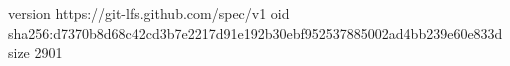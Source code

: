 version https://git-lfs.github.com/spec/v1
oid sha256:d7370b8d68c42cd3b7e2217d91e192b30ebf952537885002ad4bb239e60e833d
size 2901
